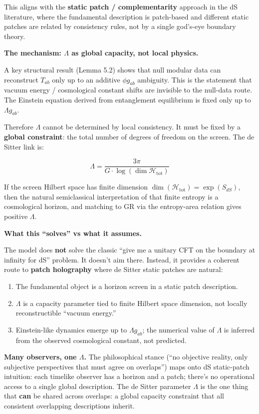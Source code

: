 \documentclass[11pt,a4paper]{article}
\theoremstyle{remark}
\providecommand{\tightlist}{%
  \setlength{\itemsep}{0pt}\setlength{\parskip}{0pt}}
\begin{document}
This aligns with the \textbf{static patch / complementarity} approach in the dS
literature, where the fundamental description is patch-based and different
static patches are related by consistency rules, not by a single god's-eye
boundary theory.

\textbf{The mechanism: \(\Lambda\) as global capacity, not local physics.}

A key structural result (Lemma 5.2) shows that null modular data can
reconstruct \(T_{ab}\) only up to an additive \(\phi g_{ab}\) ambiguity. This
is the statement that vacuum energy / cosmological constant shifts are
invisible to the null-data route. The Einstein equation derived from
entanglement equilibrium is fixed only up to \(\Lambda g_{ab}\).

Therefore \(\Lambda\) cannot be determined by local consistency. It must be
fixed by a \textbf{global constraint}: the total number of degrees of freedom on
the screen. The de Sitter link is:

\[
\Lambda = \frac{3\pi}{G \cdot \log(\dim \mathcal{H}_\mathrm{tot})}
\]

If the screen Hilbert space has finite dimension \(\dim(\mathcal{H}_\mathrm{tot})
= \exp(S_{dS})\), then the natural semiclassical interpretation of that
finite entropy is a cosmological horizon, and matching to GR via the
entropy-area relation gives positive \(\Lambda\).

\textbf{What this ``solves'' vs what it assumes.}

The model does \textbf{not} solve the classic ``give me a unitary CFT on the
boundary at infinity for dS'' problem. It doesn't aim there. Instead, it
provides a coherent route to \textbf{patch holography} where de Sitter static
patches are natural:

\begin{enumerate}
\def\labelenumi{\arabic{enumi}.}
\tightlist
\item
  The fundamental object is a horizon screen in a static patch description.
\item
  \(\Lambda\) is a capacity parameter tied to finite Hilbert space dimension,
  not locally reconstructible ``vacuum energy.''
\item
  Einstein-like dynamics emerge up to \(\Lambda g_{ab}\); the numerical
  value of \(\Lambda\) is inferred from the observed cosmological constant,
  not predicted.
\end{enumerate}

\textbf{Many observers, one \(\Lambda\).} The philosophical stance (``no objective
reality, only subjective perspectives that must agree on overlaps'') maps
onto dS static-patch intuition: each timelike observer has a horizon and a
patch; there's no operational access to a single global description. The
de Sitter parameter \(\Lambda\) is the one thing that \textbf{can} be shared
across overlaps: a global capacity constraint that all consistent
overlapping descriptions inherit.
\end{document}
